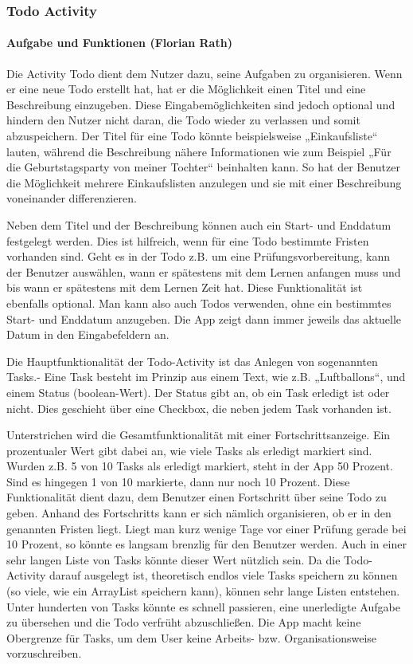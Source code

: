 \newpage
\subsubsection{Todo Activity}
\paragraph{Aufgabe und Funktionen (Florian Rath)}
Die Activity Todo dient dem Nutzer dazu, seine Aufgaben zu organisieren. Wenn er eine neue Todo erstellt hat, hat er die Möglichkeit einen Titel und eine Beschreibung einzugeben. Diese Eingabemöglichkeiten sind jedoch optional und hindern den Nutzer nicht daran, die Todo wieder zu verlassen und somit abzuspeichern. Der Titel für eine Todo könnte beispielsweise „Einkaufsliste“ lauten, während die Beschreibung nähere Informationen wie zum Beispiel „Für die Geburtstagsparty von meiner Tochter“ beinhalten kann. So hat der Benutzer die Möglichkeit mehrere Einkaufslisten anzulegen und sie mit einer Beschreibung voneinander differenzieren.

Neben dem Titel und der Beschreibung können auch ein Start- und Enddatum festgelegt werden. Dies ist hilfreich, wenn für eine Todo bestimmte Fristen vorhanden sind. Geht es in der Todo z.B. um eine Prüfungsvorbereitung, kann der Benutzer auswählen, wann er spätestens mit dem Lernen anfangen muss und bis wann er spätestens mit dem Lernen Zeit hat. Diese Funktionalität ist ebenfalls optional. Man kann also auch Todos verwenden, ohne ein bestimmtes Start- und Enddatum anzugeben. Die App zeigt dann immer jeweils das aktuelle Datum in den Eingabefeldern an.

Die Hauptfunktionalität der Todo-Activity ist das Anlegen von sogenannten Tasks.- Eine Task besteht im Prinzip aus einem Text, wie z.B. „Luftballons“, und einem Status (boolean-Wert). Der Status gibt an, ob ein Task erledigt ist oder nicht. Dies geschieht über eine Checkbox, die neben jedem Task vorhanden ist.

Unterstrichen wird die Gesamtfunktionalität mit einer Fortschrittsanzeige. Ein prozentualer Wert gibt dabei an, wie viele Tasks als erledigt markiert sind. Wurden z.B. 5 von 10 Tasks als erledigt markiert, steht in der App 50 Prozent. Sind es hingegen 1 von 10 markierte, dann nur noch 10 Prozent. Diese Funktionalität dient dazu, dem Benutzer einen Fortschritt über seine Todo zu geben. Anhand des Fortschritts kann er sich nämlich organisieren, ob er in den genannten Fristen liegt. Liegt man kurz wenige Tage vor einer Prüfung gerade bei 10 Prozent, so könnte es langsam brenzlig für den Benutzer werden. Auch in einer sehr langen Liste von Tasks könnte dieser Wert nützlich sein. Da die Todo-Activity darauf ausgelegt ist, theoretisch endlos viele Tasks speichern zu können (so viele, wie ein ArrayList speichern kann), können sehr lange Listen entstehen. Unter hunderten von Tasks könnte es schnell passieren, eine unerledigte Aufgabe zu übersehen und die Todo verfrüht abzuschließen. Die App macht keine Obergrenze für Tasks, um dem User keine Arbeits- bzw. Organisationsweise vorzuschreiben.

